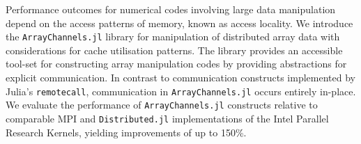 Performance outcomes for numerical codes involving large data
manipulation depend on the access patterns of memory, known as access
locality. We introduce the \texttt{ArrayChannels.jl} library for
manipulation of distributed array data with considerations for cache
utilisation patterns. The library provides an accessible tool-set for
constructing array manipulation codes by providing abstractions for
explicit communication. In contrast to communication constructs
implemented by Julia's \texttt{remotecall}, communication in
\texttt{ArrayChannels.jl} occurs entirely in-place. We evaluate the
performance of \texttt{ArrayChannels.jl} constructs relative to
comparable MPI and \texttt{Distributed.jl} implementations of the Intel
Parallel Research Kernels, yielding improvements of up to 150\%.
